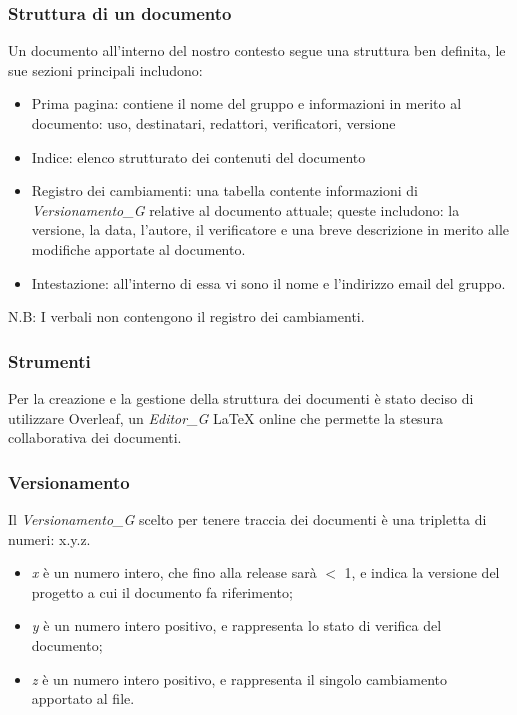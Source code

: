 \documentclass[12pt, oneside]{article}
\begin{document}
\subsubsection{Struttura di un documento}
Un documento all'interno del nostro contesto segue una struttura ben definita, le sue sezioni principali includono:
\begin{itemize}
    \item Prima pagina: contiene il nome del gruppo e informazioni in merito al documento: uso, destinatari, redattori, verificatori, versione
    \item Indice: elenco strutturato dei contenuti del documento
    \item Registro dei cambiamenti: una tabella contente informazioni di \textit{Versionamento_G} relative al documento attuale; queste includono: la versione, la data, l'autore, il verificatore e una breve descrizione in merito alle modifiche apportate al documento.
    \item Intestazione: all'interno di essa vi sono il nome e l'indirizzo email del gruppo.
\end{itemize}

N.B: I verbali non contengono il registro dei cambiamenti.

\subsubsection{Strumenti}
Per la creazione e la gestione della struttura dei documenti è stato deciso di utilizzare Overleaf, un \textit{Editor_G} LaTeX online che permette la stesura collaborativa dei documenti.

\subsubsection{Versionamento}

Il \textit{Versionamento_G} scelto per tenere traccia dei documenti è una tripletta di numeri: x.y.z.

\begin{itemize}
    \item \textit{x} è un numero intero, che fino alla release sarà $<$ 1, e indica la versione del progetto a cui il documento fa riferimento;
    \item \textit{y} è un numero intero positivo, e rappresenta lo stato di verifica del documento;
    \item \textit{z} è un numero intero positivo, e rappresenta il singolo cambiamento apportato al file.
\end{itemize}
\end{document}
